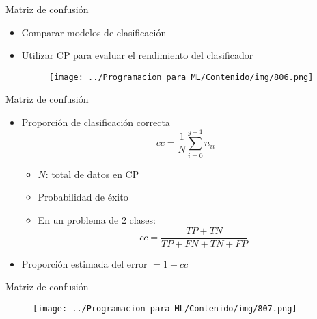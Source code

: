 \documentclass[11pt,aspectratio=169]{beamer}
\begin{document}
\begin{frame}{Matriz de confusión}
\begin{itemize}
	\item Comparar modelos de clasificación\pause
	\item Utilizar CP para evaluar el rendimiento del clasificador\pause
	\begin{figure}[H]
		\centering
		\texttt{[image: ../Programacion para ML/Contenido/img/806.png]}
	\end{figure}
\end{itemize}
\end{frame}

\begin{frame}{Matriz de confusión}
\begin{itemize}
	\item Proporción de clasificación correcta
	\[ cc = \dfrac{1}{N}\sum_{i=0}^{g-1}n_{ii} \]\pause
		\begin{itemize}
			\item $N$: total de datos en CP\pause
			\item Probabilidad de éxito\pause
			\item En un problema de 2 clases:
			\[ cc = \dfrac{TP+TN}{TP+FN+TN+FP} \]\pause
		\end{itemize}
	\item Proporción estimada del error $ = 1-cc$
\end{itemize}
\end{frame}

\begin{frame}{Matriz de confusión}
\begin{figure}[H]
	\centering
	\texttt{[image: ../Programacion para ML/Contenido/img/807.png]}
\end{figure}
\end{frame}
\end{document}
